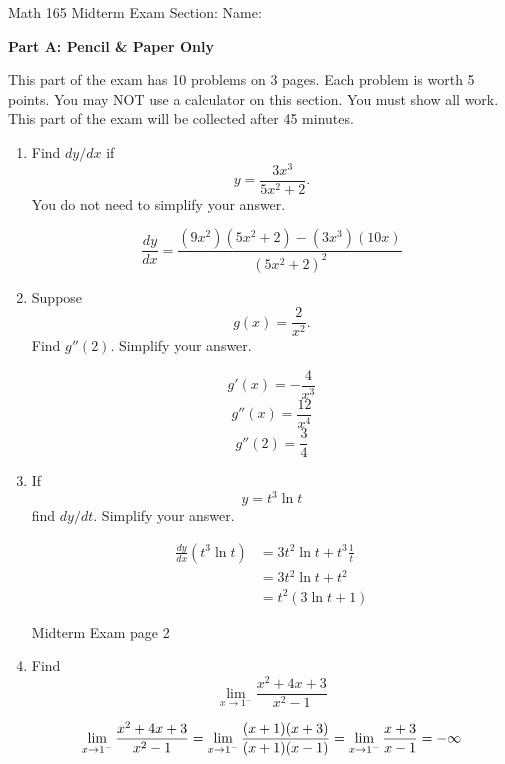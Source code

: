 \documentclass[12pt]{article}
\begin{document}
\pagestyle{empty}


\noindent Math 165 Midterm Exam \hskip1cm Section:\underline{\phantom{XXXXXX}} \hfill Name:\underline{\phantom{XXXXXXXXXX}}

\bigskip

{\bf Part A: Pencil \& Paper Only}

\bigskip

\noindent This part of the exam has 10 problems on 3 pages. Each problem is worth 5 points. You
may NOT use a calculator on this section. You must show all work. This part of the exam
will be collected after 45 minutes.

\begin{enumerate}
\item 
Find $dy/dx$ if
\[
y = \frac{3x^3}{5x^2 + 2}.
\]
You do not need to simplify your answer.

\medskip


\[
\frac{dy}{dx} = \frac{(9x^2)(5x^2 + 2) - (3x^3)(10x)}{(5x^2+2)^2}
\]

\medskip

\item
Suppose 
\[
g(x) = \frac{2}{x^2}.
\]
Find $g''(2)$. Simplify your answer.

\medskip
{}
\[
g'(x) = -\frac{4}{x^3}
\]
\[
g''(x) = \frac{12}{x^4}
\]
\[
g''(2) = \frac{3}{4}
\]
\bigskip

\item If 
\[
y = t^3 \ln t
\]
find $dy/dt$. Simplify your answer.

\medskip
{}
\begin{align*}
\frac{dy}{dx}(t^3\ln t) &= 3t^2\ln t + t^3\frac{1}{t}\\
&= 3t^2\ln t + t^2 \\
&= t^2(3\ln t + 1)
\end{align*}

\bigskip

\newpage

\noindent Midterm Exam \hfill page 2

\item Find
\[
\lim_{x\rightarrow 1^-} \frac{x^2 + 4x + 3}{x^2 - 1}
\]

\medskip
{}
\[
\lim_{x\rightarrow 1^-} \frac{x^2 + 4x + 3}{x^2 - 1}=\lim_{x\rightarrow 1^-} \frac{(x+1)(x+3)}{(x+1)(x-1)}
=\lim_{x\rightarrow 1^-} \frac{x+3}{x-1}\\ 
=-\infty
\]


\end{enumerate}
\end{document}
